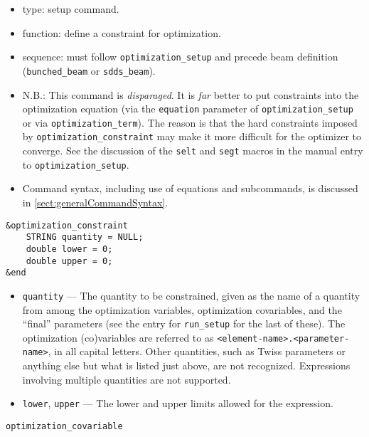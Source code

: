 \documentclass[11pt]{article}
\begin{document}
\begin{itemize}
\item type: setup command.
\item function: define a constraint for optimization.
\item sequence: must follow \verb|optimization_setup| and precede beam definition (\verb|bunched_beam| or \verb|sdds_beam|).
\item N.B.: This command is {\em disparaged}. It is {\em far} better to put constraints
	into the optimization equation (via the \verb|equation| parameter of
	\verb|optimization_setup| or via \verb|optimization_term|).  The reason
	is that the hard constraints imposed by \verb|optimization_constraint|
	may make it more difficult for the optimizer to converge.  See the discussion of the
        \verb|selt| and \verb|segt| macros in the manual entry to \verb|optimization_setup|.
\item Command syntax, including use of equations and subcommands, is discussed in \ref{sect:generalCommandSyntax}.
\end{itemize}

\begin{verbatim}
&optimization_constraint
    STRING quantity = NULL;
    double lower = 0;
    double upper = 0;
&end
\end{verbatim}

\begin{itemize}

\item \verb|quantity| --- The quantity to be constrained, given as the
name of a quantity from among the optimization variables, optimization
covariables, and the ``final'' parameters (see the entry for
\verb|run_setup| for the last of these).  The optimization
(co)variables are referred to as
\verb|<element-name>.<parameter-name>|, in all capital letters.  Other
quantities, such as Twiss parameters or anything else but what is
listed just above, are not recognized.  Expressions involving multiple
quantities are not supported.

\item \verb|lower|, \verb|upper| --- The lower and upper limits
allowed for the expression.

\end{itemize}

\newpage
\begin{center}{\Large\verb|optimization_covariable|}\end{center}
\end{document}
